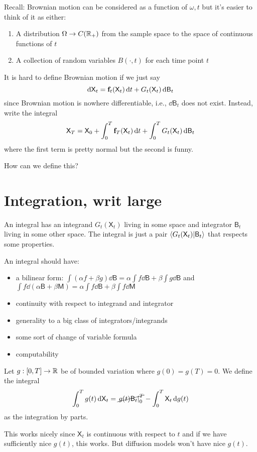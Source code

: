 \documentclass[notes]{agony}
\newcommand{\rv}{\mathsf}
\newcommand{\X}{\rv{X}}
\begin{document}
Recall: Brownian motion can be considered as a function of $\omega,t$
but it's easier to think of it as either:
\begin{enumerate}
	\item A distribution $\Omega \to C(\mathbb{R}_+)$ from the sample space to the space of continuous functions of $t$
	\item A collection of random variables $B(\cdot,t)$ for each time point $t$
\end{enumerate}

It is hard to define Brownian motion if we just say
\[ \dd{\rv X_t} = \vb f_t(\rv X_t)\dd{t} + G_t(\rv X_t) \dd{\rv B_t} \]
since Brownian motion is nowhere differentiable, i.e., $\dd{\rv B_t}$ does not exist.
Instead, write the integral
\[ \rv X_T = \rv X_0 + \int_0^T \vb f_T(\rv X_t) \dd{t} + \int_0^T G_t(\rv X_t) \dd{\rv B_t} \]
where the first term is pretty normal but the second is funny.

How can we define this?

\section{Integration, writ large}

An integral has an integrand $G_t(\X_t)$ living in some space
and integrator $\rv B_t$ living in some other space.
The integral is just a pair $\ip{G_t(\X_t)}{\rv B_t}$ that respects some properties.

An integral should have:
\begin{itemize}[nosep]
	\item a bilinear form: $\int(\alpha f+\beta g)\dd{\rv B} = \alpha\int f\dd{\rv B} + \beta\int g\dd{\rv B}$
	      and $\int f \dd{(\alpha\rv B + \beta \rv M)} = \alpha\int f\dd{\rv B} + \beta\int f\dd{\rv M}$
	\item continuity with respect to integrand and integrator
	\item generality to a big class of integrators/integrands
	\item some sort of change of variable formula
	\item computability
\end{itemize}

\begin{defn}
	Let $g : [0,T] \to \mathbb{R}$ be of bounded variation where $g(0) = g(T) = 0$.
	We define the integral
	\[ \int_0^T g(t) \dd{\rv X_t} = \cancel{\left.g(t)\rv B_t\right|_0^T} -\int_0^T \rv X_t \dd{g(t)} \]
	as the integration by parts.
\end{defn}
This works nicely since $\rv X_t$ is continuous with respect to $t$
and if we have sufficiently nice $g(t)$, this works.
But diffusion models won't have nice $g(t)$.
\end{document}
